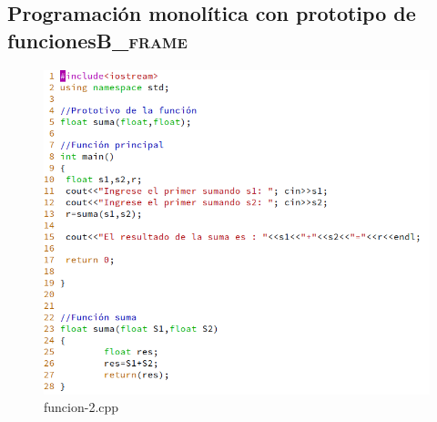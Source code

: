 \documentclass[presentation, aspectratio=54]{beamer}
\begin{document}
\subsection{Programación monolítica con prototipo de funciones\hfill{}\textsc{B\_frame}}
\label{sec:orgc34b861}
\begin{figure}[htbp]
\centering
\includegraphics[width=0.8\linewidth]{./images/codigo/funcion2.png}
funcion-2.cpp
\end{figure}
\end{document}
